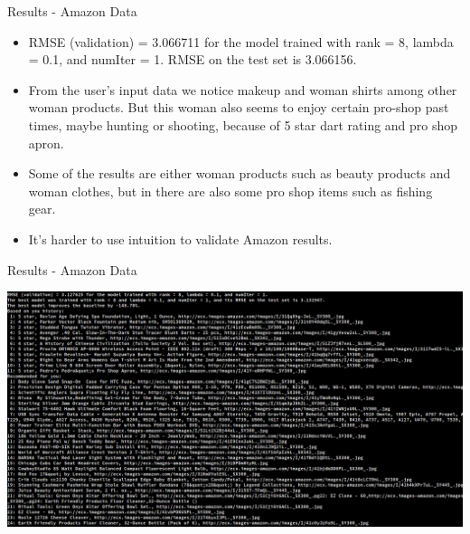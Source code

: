 \documentclass{beamer}
\begin{document}

\begin{frame}{Results - Amazon Data}{}

  \begin{itemize}
      \item {
        RMSE (validation) = 3.066711 for the model trained with rank = 8, lambda = 0.1, and numIter = 1.
        RMSE on the test set is 3.066156.
      }
      \item {
        From the user's input data we notice makeup and woman shirts among other woman products.  But this woman also seems to enjoy certain pro-shop past times, maybe hunting or shooting, because of 5 star dart rating and pro shop apron.
      }
      \item {
        Some of the results are either woman products such as beauty products and woman clothes, but in there are also some pro shop items such as fishing gear.
      }
      \item {
        It's harder to use intuition to validate Amazon results.
      }
  \end{itemize}
  
\end{frame}


\begin{frame}{Results - Amazon Data}{}

      \includegraphics[width=.98\textwidth, clip=true, trim = 0cm 1cm 7cm 0cm]{image/amazon_results_crop}
  
\end{frame}
\end{document}
